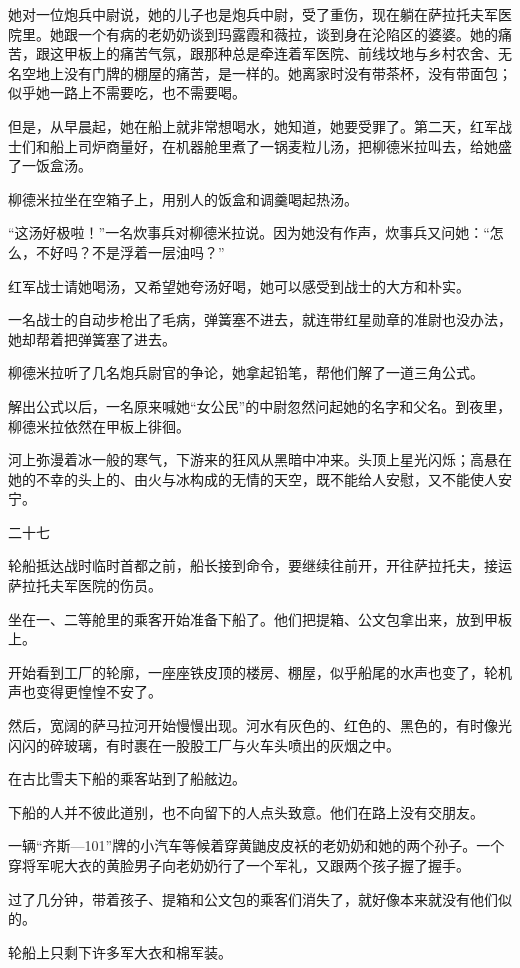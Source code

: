 她对一位炮兵中尉说，她的儿子也是炮兵中尉，受了重伤，现在躺在萨拉托夫军医院里。她跟一个有病的老奶奶谈到玛露霞和薇拉，谈到身在沦陷区的婆婆。她的痛苦，跟这甲板上的痛苦气氛，跟那种总是牵连着军医院、前线坟地与乡村农舍、无名空地上没有门牌的棚屋的痛苦，是一样的。她离家时没有带茶杯，没有带面包；似乎她一路上不需要吃，也不需要喝。

但是，从早晨起，她在船上就非常想喝水，她知道，她要受罪了。第二天，红军战士们和船上司炉商量好，在机器舱里煮了一锅麦粒儿汤，把柳德米拉叫去，给她盛了一饭盒汤。

柳德米拉坐在空箱子上，用别人的饭盒和调羹喝起热汤。

“这汤好极啦！”一名炊事兵对柳德米拉说。因为她没有作声，炊事兵又问她：“怎么，不好吗？不是浮着一层油吗？”

红军战士请她喝汤，又希望她夸汤好喝，她可以感受到战士的大方和朴实。

一名战士的自动步枪出了毛病，弹簧塞不进去，就连带红星勋章的准尉也没办法，她却帮着把弹簧塞了进去。

柳德米拉听了几名炮兵尉官的争论，她拿起铅笔，帮他们解了一道三角公式。

解出公式以后，一名原来喊她“女公民”的中尉忽然问起她的名字和父名。到夜里，柳德米拉依然在甲板上徘徊。

河上弥漫着冰一般的寒气，下游来的狂风从黑暗中冲来。头顶上星光闪烁；高悬在她的不幸的头上的、由火与冰构成的无情的天空，既不能给人安慰，又不能使人安宁。

二十七

轮船抵达战时临时首都之前，船长接到命令，要继续往前开，开往萨拉托夫，接运萨拉托夫军医院的伤员。

坐在一、二等舱里的乘客开始准备下船了。他们把提箱、公文包拿出来，放到甲板上。

开始看到工厂的轮廓，一座座铁皮顶的楼房、棚屋，似乎船尾的水声也变了，轮机声也变得更惶惶不安了。

然后，宽阔的萨马拉河开始慢慢出现。河水有灰色的、红色的、黑色的，有时像光闪闪的碎玻璃，有时裹在一股股工厂与火车头喷出的灰烟之中。

在古比雪夫下船的乘客站到了船舷边。

下船的人并不彼此道别，也不向留下的人点头致意。他们在路上没有交朋友。

一辆“齐斯—101”牌的小汽车等候着穿黄鼬皮皮袄的老奶奶和她的两个孙子。一个穿将军呢大衣的黄脸男子向老奶奶行了一个军礼，又跟两个孩子握了握手。

过了几分钟，带着孩子、提箱和公文包的乘客们消失了，就好像本来就没有他们似的。

轮船上只剩下许多军大衣和棉军装。

